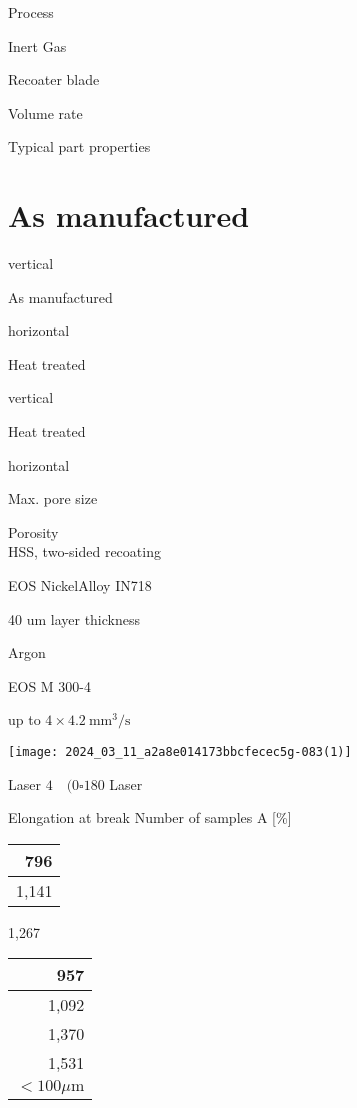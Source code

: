 \documentclass[10pt]{article}
\begin{document}
Process

Inert Gas

Recoater blade

Volume rate

Typical part properties

\section*{As manufactured}
vertical

As manufactured

horizontal

Heat treated

vertical

Heat treated

horizontal

Max. pore size

Porosity\\
HSS, two-sided recoating

EOS NickelAlloy IN718

40 um layer thickness

Argon

EOS M 300-4

up to $4 \times 4.2 \mathrm{~mm}^{3} / \mathrm{s}$

\begin{center}
\texttt{[image: 2024\_03\_11\_a2a8e014173bbcfecec5g-083(1)]}
\end{center}

Laser $4 \quad(0 \square 180$ Laser

Elongation at break Number of samples A [\%]

\begin{center}
\begin{tabular}{r}
796 \\
\hline
1,141 \\
\hline
\end{tabular}
\end{center}

1,267

\begin{center}
\begin{tabular}{r}
957 \\
\hline
1,092 \\
\hline
1,370 \\
\hline
1,531 \\
\hline
$<100 \mu \mathrm{m}$ \\
\hline
\end{tabular}
\end{center}
\end{document}
